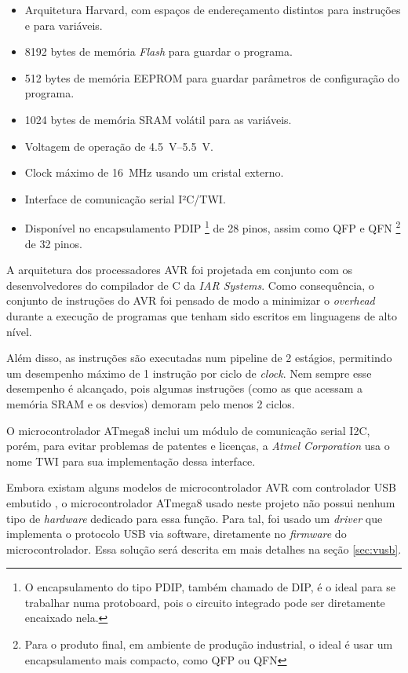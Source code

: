 \documentclass[brazil,pagestart=firstchapter]{abnt}
\begin{document}
\begin{itemize}
\item Arquitetura Harvard, com espaços de endereçamento distintos para 
instruções e para variáveis.
\item \num{8192} bytes de memória \textit{Flash} para guardar o programa.
\item \num{512} bytes de memória \ac{EEPROM} para guardar parâmetros de
configuração do programa.
\item \num{1024} bytes de memória \ac{SRAM} volátil para as variáveis.
\item Voltagem de operação de \SIrange{4.5}{5.5}{\volt}.
\item Clock máximo de \SI{16}{\mega\hertz} usando um cristal externo.
\item Interface de comunicação serial I²C/TWI.
\item Disponível no encapsulamento PDIP
	\footnote{O encapsulamento do tipo \ac{PDIP}, também chamado de \ac{DIP},
	é o ideal para se trabalhar numa protoboard, pois o circuito integrado
	pode ser diretamente encaixado nela.}
de 28 pinos, assim como QFP e QFN
	\footnote{Para o produto final, em ambiente de produção industrial, o
	ideal é usar um encapsulamento mais compacto, como \ac{QFP} ou \ac{QFN}}
de 32 pinos.
\end{itemize}

A arquitetura dos processadores AVR foi projetada em conjunto com os
desenvolvedores do compilador de C da \textit{IAR Systems}. Como
consequência, o conjunto de instruções do AVR foi pensado de modo a
minimizar o \textit{overhead} durante a execução de programas que tenham
sido escritos em linguagens de alto nível. \cite{avr_iar_design}

Além disso, as instruções são executadas num pipeline de 2 estágios,
permitindo um desempenho máximo de 1 instrução por ciclo de \textit{clock}.
\cite[p.~9]{ATmega8} Nem sempre esse desempenho é alcançado, pois algumas
instruções (como as que acessam a memória \ac{SRAM} e os desvios) demoram
pelo menos 2 ciclos. \cite[p.~282]{ATmega8}

O microcontrolador ATmega8 inclui um módulo de comunicação serial \ac{I2C},
porém, para evitar problemas de patentes e licenças, a \textit{Atmel
Corporation} usa o nome \ac{TWI} para sua implementação dessa interface.
\cite{avrlibctwi}

Embora existam alguns modelos de microcontrolador AVR com controlador
\ac{USB} embutido \cite{atmel_avr_product_list}, o microcontrolador ATmega8
usado neste projeto não possui nenhum tipo de \textit{hardware} dedicado
para essa função. Para tal, foi usado um \textit{driver} que implementa o
protocolo \ac{USB} via software, diretamente no \textit{firmware} do
microcontrolador. Essa solução será descrita em mais detalhes na seção
\ref{sec:vusb}.
\end{document}
